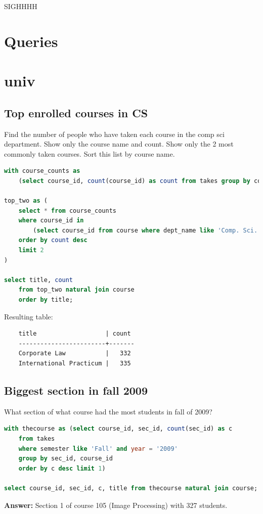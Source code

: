\documentclass[11pt, oneside]{amsart}   	%
\begin{document}
SIGHHHH

\section{Queries}







\section{univ}

\subsection{Top enrolled courses in CS}

 Find the number of people who have taken each course in the comp sci department. Show only the course name and count. Show only the 2 most commonly taken courses. Sort this list by course name.

\begin{lstlisting}[language=SQL]
with course_counts as 
    (select course_id, count(course_id) as count from takes group by course_id),

top_two as (
    select * from course_counts 
    where course_id in 
        (select course_id from course where dept_name like 'Comp. Sci.')
    order by count desc
    limit 2
)

select title, count
    from top_two natural join course 
    order by title;
\end{lstlisting}

Resulting table: 

\begin{verbatim}
    title                   | count
    ------------------------+-------
    Corporate Law           |   332
    International Practicum |   335
\end{verbatim}

\subsection{Biggest section in fall 2009}

 What section of what course had the most students in fall of 2009?

\begin{lstlisting}[language=SQL]
with thecourse as (select course_id, sec_id, count(sec_id) as c 
    from takes 
    where semester like 'Fall' and year = '2009'
    group by sec_id, course_id
    order by c desc limit 1)

select course_id, sec_id, c, title from thecourse natural join course;
\end{lstlisting}
\textbf{Answer: } Section 1 of course 105 (Image Processing) with 327 students. 
\end{document}
